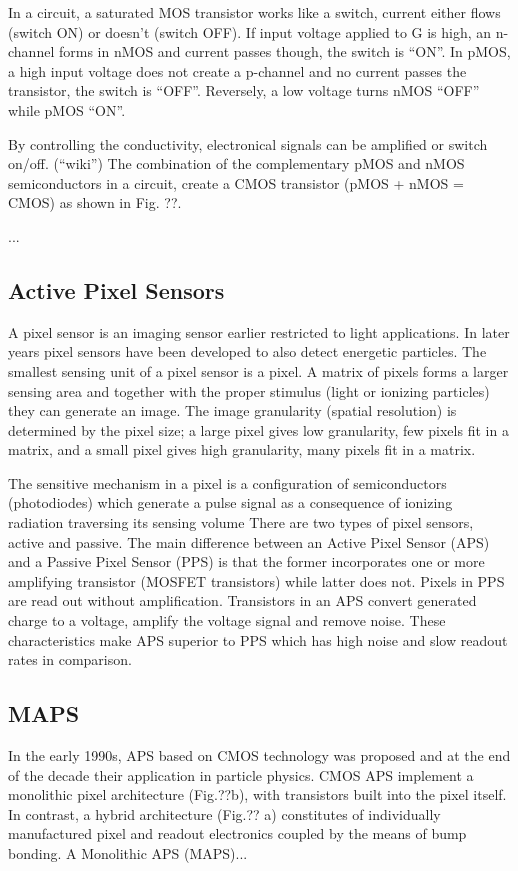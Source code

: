 In a circuit, a saturated MOS transistor works like a switch, current either flows (switch ON) or doesn’t (switch OFF). If input voltage applied to G is high, an n-channel forms in nMOS and current passes though, the switch is “ON”. In pMOS, a high input voltage does not create a p-channel and no current passes the transistor, the switch is “OFF”. Reversely, a low voltage turns nMOS “OFF” while pMOS “ON”.

By controlling the conductivity, electronical signals can be amplified or switch on/off. (“wiki”) The combination of the complementary pMOS and nMOS semiconductors in a circuit, create a CMOS transistor (pMOS + nMOS = CMOS) as shown in Fig. ??.

...

\subsection{Active Pixel Sensors}
A pixel sensor is an imaging sensor earlier restricted to light applications. In later years pixel sensors have been developed to also detect energetic particles.
The smallest sensing unit of a pixel sensor is a pixel. A matrix of pixels forms a larger sensing area and together with the proper stimulus (light or ionizing particles) they can generate an image. The image granularity (spatial resolution) is determined by the pixel size; a large pixel gives low granularity, few pixels fit in a matrix, and a small pixel gives high granularity, many pixels fit in a matrix.

The sensitive mechanism in a pixel is a configuration of semiconductors (photodiodes) which generate a pulse signal as a consequence of ionizing radiation traversing its sensing volume
There are two types of pixel sensors, active and passive. The main difference between an Active Pixel Sensor (APS) and a Passive Pixel Sensor (PPS) is that the former incorporates one or more amplifying transistor (MOSFET transistors) while latter does not. Pixels in PPS are read out without amplification. Transistors in an APS convert generated charge to a voltage, amplify the voltage signal and remove noise. These characteristics make APS superior to PPS which has high noise and slow readout rates in comparison.

\subsection{MAPS}
In the early 1990s, APS based on CMOS technology was proposed and at the end of the decade their application in particle physics. CMOS APS implement a monolithic pixel architecture (Fig.??b), with transistors built into the pixel itself. In contrast, a hybrid architecture (Fig.?? a) constitutes of individually manufactured pixel and readout electronics coupled by the means of bump bonding.
A Monolithic APS (MAPS)...
